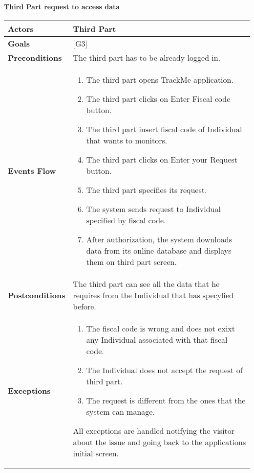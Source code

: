 \documentclass[12pt]{article}
\begin{document}
\paragraph{Third Part request to access data}
\begin{center}
    \begin{tabular} { |p{}|p{}| }
         \hline
         \textbf{Actors} & Third Part \\ 
         \hline
         \textbf{Goals} & {[G3]} \\ 
         \hline  
         \textbf{Preconditions} & The third part has to be already logged in. \\ 
         \hline
         \textbf{Events Flow} & \begin{enumerate}[topsep=0pt]
             \setlength{\itemsep}{0.5pt}
             \item The third part opens TrackMe application.
             \item The third part clicks on Enter Fiscal code button.
             \item The third part insert fiscal code of Individual that wants to monitors.
             \item The third part clicks on Enter your Request button. 
             \item The third part specifies its request.
             \item The system sends request to Individual specified by fiscal code.
             \item After authorization, the system downloads data from its online database and displays them on third part screen.
             \end{enumerate} \\ 
        \hline
        \textbf{Postconditions} & The third part can see all the data that he requires from the Individual that has specyfied before. \\
        \hline 
        \textbf{Exceptions} & \begin{enumerate}[topsep=0pt] 
              \setlength{\itemsep}{0.5pt}
              \item The fiscal code is wrong and does not exixt any Individual associated with that fiscal code. 
              \item The Individual does not accept the request of third part. 
              \item The request is different from the ones that the system can manage. 
              \end{enumerate}
               All exceptions are handled notifying the visitor about the issue and going back to the applications initial screen.\\ 
        \hline
    \end{tabular}
\end{center}
  
\end{document}
